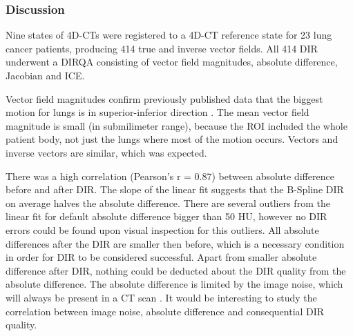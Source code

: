 



\newpage
\subsubsection{Discussion}

Nine states of 4D-CTs were registered to a 4D-CT reference state for 23 lung cancer patients, producing 414 true and inverse vector fields. 
All 414 DIR underwent a DIRQA consisting of vector field magnitudes, absolute difference, Jacobian and ICE.

Vector field magnitudes confirm previously published data that the biggest motion for lungs is in superior-inferior direction \cite{Seppenwoolde2002, Britton2007, Liu2007}. The mean vector field magnitude is small (in submilimeter range), 
because the ROI included the whole patient body, not just the lungs where most of the motion occurs. Vectors and inverse vectors are similar, which was expected.

There was a high correlation (Pearson's r = 0.87) between absolute difference before and after DIR. 
The slope of the linear fit suggests that the B-Spline DIR on average halves the absolute difference. There are several outliers from the
linear fit for default absolute difference bigger than 50 HU, however no DIR errors could be found upon visual inspection for this outliers.
All absolute differences after the DIR are smaller then before, which is a necessary condition in order for DIR to be considered successful. Apart from smaller absolute difference after DIR,
nothing could be deducted about the DIR quality from the absolute difference. The absolute difference is limited by the
image noise, which will always be present in a CT scan \cite{Polacin1992}. It would be interesting to study the 
correlation between image noise, absolute difference and consequential DIR quality.


